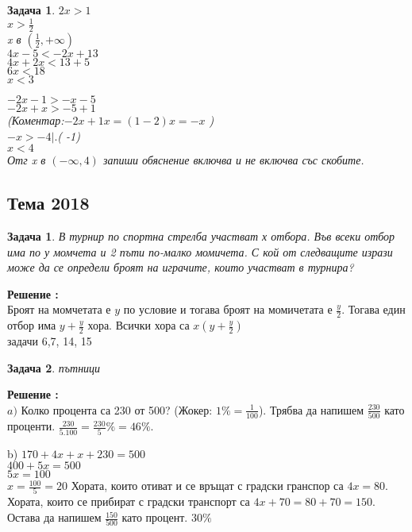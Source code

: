 \documentclass{article}
\theoremstyle{plain}
\newtheorem*{problem*}{Задача}
\newtheorem{problem}{Задача}
\newcounter{solution}
\newcommand\solution{%
	\stepcounter{solution}%
	\textbf{Решение :}\\%
}
\begin{document}
\begin{problem}
	$2x > 1 $ \\
	$x > \frac{1}{2} $\\
	x в $(\frac{1}{2}, + \infty) $\\
	
	
	$4x - 5 < -2x + 13 $\\
	$4x +2x < 13 +5 $\\
	$6x < 18 $\\
	$x < 3  $
	
	$ -2x -1 > -x -5 $ \\
	$-2x +x >  -5 +1  $\\
	(Коментар:$-2x + 1x = (1-2)x = -x$ ) \\
	
	$-x > -4 |.$( -1)\\
	$ x < 4 $ \\
	Отг x в $(-\infty , 4) $
	запиши обяснение включва и не включва със скобите.
\end{problem}


\subsection{Тема 2018}
\begin{problem*}
	В турнир по спортна стрелба участват х отбора. Във всеки отбор има по у момчета и 2 пъти
	по-малко момичета. С кой от следващите изрази може да се определи броят на играчите, които
	участват в турнира?
\end{problem*}
\solution Броят на момчетата е $y$ по условие и тогава броят на момичетата е $\frac{y}{2}$. Тогава един отбор има $y + \frac{y}{2}$ хора. Всички хора са $x(y+\frac{y}{2}) $ \\

задачи 6,7, 14, 15

\begin{problem*}
	пътници
\end{problem*}

\solution
$a )$ Колко процента са 230 от 500? (Жокер: $1\% = \frac{1}{100} $). Трябва да напишем  $\frac{230}{500}$ като проценти. $\frac{230}{5.100} = \frac{230}{5}\% = 46\%$.

b) $170 + 4x + x+ 230 = 500 $ \\
$ 400 + 5x = 500 $ \\ $5x = 100 $ \\
$x = \frac{100}{5} = 20  $
Хората, които отиват и се връщат с градски гранспор са $4x = 80 $. Хората, които се прибират с градски транспорт са $4x +70 = 80 + 70 = 150.$ Остава да напишем $\frac{150}{500} $ като процент. 
$30\% $
\end{document}
